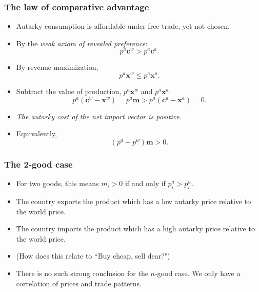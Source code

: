 \documentclass[compress,mathserif,aspectratio=169]{beamer}
\begin{document}
\begin{frame}\frametitle{The law of comparative advantage}\hypertarget{The law of comparative advantage}{}
\begin{itemize}
\item Autarky consumption is affordable under free trade, yet not chosen.

\item By the \emph{weak axiom of revealed preference}:
\[
p^a\mathbf c^w > p^a\mathbf c^a.
\]

\item By revenue maximization,
\[
p^a\mathbf x^w \le p^a\mathbf x^a.
\]

\item Subtract the value of production, $p^a\mathbf x^w$ and $p^a \mathbf x^a$:
\[
p^a(\mathbf c^w-\mathbf x^w) = p^a\mathbf m > p^a(\mathbf c^a-\mathbf x^a)=0.
\]

\item \emph{The autarky cost of the net import vector is positive}.

\item Equivalently,
\[
(p^a-p^w)\mathbf m > 0.
\]


\end{itemize}
\end{frame}



\begin{frame}\frametitle{The 2-good case}\hypertarget{The 2-good case}{}
\begin{itemize}
\item For two goods, this means $m_i>0$ if and only if $p^a_i>p^w_i$.

\item The country exports the product which has a low autarky price relative to the world price.

\item The country imports the product which has a high autarky price relative to the world price.

\item (How does this relate to ``Buy cheap, sell dear?")

\item There is no such strong conclusion for the $n$-good case. We only have a correlation of prices and trade patterns.




\end{itemize}
\end{frame}
\end{document}
